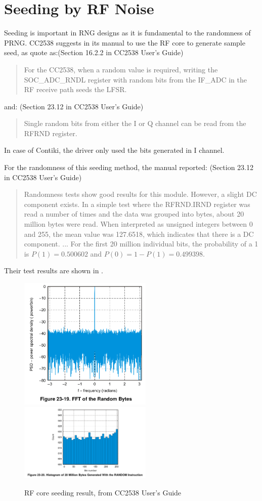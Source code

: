 \section{Seeding by RF Noise} \label{Seed}

Seeding is important in RNG designs as it is fundamental to the randomness of PRNG. CC2538 suggests in its manual to  use the RF core to generate sample seed, as quote as:(Section 16.2.2 in CC2538 User's Guide\cite{CC2538Manual})
\begin{quote}
For the CC2538, when a random value is required, writing the SOC\_ADC\_RNDL register with random bits from the IF\_ADC in the RF receive path seeds the LFSR.
\end{quote}
and: (Section 23.12 in CC2538 User's Guide\cite{CC2538Manual})
\begin{quote}
Single random bits from either the I or Q channel can be read from the RFRND register.
\end{quote}
In case of Contiki, the driver only used the bits generated in I channel.

For the randomness of this seeding method, the manual\cite{CC2538Manual} reported: (Section 23.12 in CC2538 User's Guide\cite{CC2538Manual})
\begin{quote}
Randomness tests show good results for this module. However, a slight DC component exists. In a simple test where the RFRND.IRND register was read a number of times and the data was grouped into bytes, about 20 million bytes were read. When interpreted as unsigned integers between 0 and 255, the mean value was 127.6518, which indicates that there is a DC component.
...
For the first 20 million individual bits, the probability of a 1 is $P(1) = 0.500602$ and $P(0) = 1 - P(1) = 0.499398$.
\end{quote}

Their test results are shown in .

\begin{figure}[!t]
\centering
\includegraphics[width=2.5in]{fig/CC2538_Seed1.png}
\includegraphics[width=2.5in]{fig/CC2538_Seed2.png}
\caption{RF core seeding result, from CC2538 User's Guide}
\label{SeedResult}
\end{figure}

